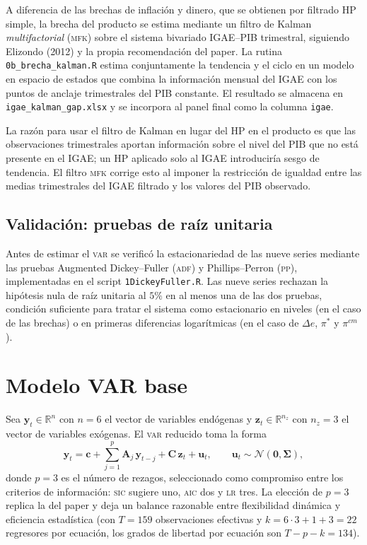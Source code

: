 \documentclass[11pt,letterpaper]{article}
\begin{document}
A diferencia de las brechas de inflación y dinero, que se obtienen por filtrado HP simple, la brecha del producto se estima mediante un filtro de Kalman \textit{multifactorial} (\textsc{mfk}) sobre el sistema bivariado IGAE--PIB trimestral, siguiendo Elizondo (2012) y la propia recomendación del paper. La rutina \texttt{0b\_brecha\_kalman.R} estima conjuntamente la tendencia y el ciclo en un modelo en espacio de estados que combina la información mensual del IGAE con los puntos de anclaje trimestrales del PIB constante. El resultado se almacena en \texttt{igae\_kalman\_gap.xlsx} y se incorpora al panel final como la columna \texttt{igae}.

La razón para usar el filtro de Kalman en lugar del HP en el producto es que las observaciones trimestrales aportan información sobre el nivel del PIB que no está presente en el IGAE; un HP aplicado solo al IGAE introduciría sesgo de tendencia. El filtro \textsc{mfk} corrige esto al imponer la restricción de igualdad entre las medias trimestrales del IGAE filtrado y los valores del PIB observado.

\subsection{Validación: pruebas de raíz unitaria}

Antes de estimar el \textsc{var} se verificó la estacionariedad de las nueve series mediante las pruebas Augmented Dickey--Fuller (\textsc{adf}) y Phillips--Perron (\textsc{pp}), implementadas en el script \texttt{1DickeyFuller.R}. Las nueve series rechazan la hipótesis nula de raíz unitaria al $5\%$ en al menos una de las dos pruebas, condición suficiente para tratar el sistema como estacionario en niveles (en el caso de las brechas) o en primeras diferencias logarítmicas (en el caso de $\Delta e$, $\pi^*$ y $\pi^{cm}$).

\section{Modelo VAR base}\label{sec:var}

Sea $\bm{y}_t \in \mathbb{R}^n$ con $n=6$ el vector de variables endógenas y $\bm{z}_t \in \mathbb{R}^{n_z}$ con $n_z=3$ el vector de variables exógenas. El \textsc{var} reducido toma la forma
\begin{equation}
\bm{y}_t = \bm{c} + \sum_{j=1}^{p} \bm{A}_j \, \bm{y}_{t-j} + \bm{C}\,\bm{z}_t + \bm{u}_t,
\qquad
\bm{u}_t \sim \mathcal{N}(\bm{0}, \bm{\Sigma}),
\label{eq:var_reducido}
\end{equation}
donde $p=3$ es el número de rezagos, seleccionado como compromiso entre los criterios de información: \textsc{sic} sugiere uno, \textsc{aic} dos y \textsc{lr} tres. La elección de $p=3$ replica la del paper y deja un balance razonable entre flexibilidad dinámica y eficiencia estadística (con $T=159$ observaciones efectivas y $k=6\cdot 3 + 1 + 3 = 22$ regresores por ecuación, los grados de libertad por ecuación son $T-p-k = 134$).
\end{document}

